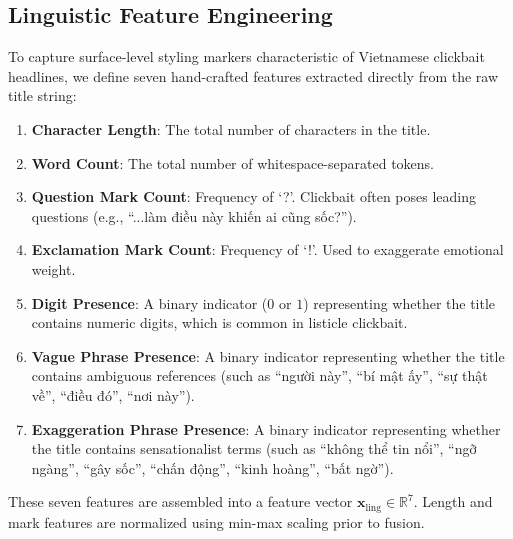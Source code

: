 \documentclass[conference]{IEEEtran}
\begin{document}
\subsection{Linguistic Feature Engineering}
To capture surface-level styling markers characteristic of Vietnamese clickbait headlines, we define seven hand-crafted features extracted directly from the raw title string:
\begin{enumerate}
    \item \textbf{Character Length}: The total number of characters in the title.
    \item \textbf{Word Count}: The total number of whitespace-separated tokens.
    \item \textbf{Question Mark Count}: Frequency of `?'. Clickbait often poses leading questions (e.g., ``...làm điều này khiến ai cũng sốc?'').
    \item \textbf{Exclamation Mark Count}: Frequency of `!'. Used to exaggerate emotional weight.
    \item \textbf{Digit Presence}: A binary indicator ($0$ or $1$) representing whether the title contains numeric digits, which is common in listicle clickbait.
    \item \textbf{Vague Phrase Presence}: A binary indicator representing whether the title contains ambiguous references (such as ``người này'', ``bí mật ấy'', ``sự thật về'', ``điều đó'', ``nơi này'').
    \item \textbf{Exaggeration Phrase Presence}: A binary indicator representing whether the title contains sensationalist terms (such as ``không thể tin nổi'', ``ngỡ ngàng'', ``gây sốc'', ``chấn động'', ``kinh hoàng'', ``bất ngờ'').
\end{enumerate}
These seven features are assembled into a feature vector $\mathbf{x}_{\text{ling}} \in \mathbb{R}^7$. Length and mark features are normalized using min-max scaling prior to fusion.
\end{document}
